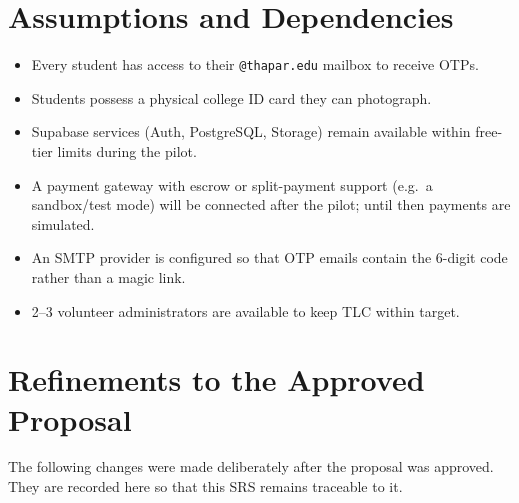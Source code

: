 \documentclass[11pt,a4paper]{scrreprt}
\begin{document}
\section{Assumptions and Dependencies}
\begin{itemize}
  \item Every student has access to their \texttt{@thapar.edu} mailbox to
    receive OTPs.
  \item Students possess a physical college ID card they can photograph.
  \item Supabase services (Auth, PostgreSQL, Storage) remain available
    within free-tier limits during the pilot.
  \item A payment gateway with escrow or split-payment support (e.g.\ a
    sandbox/test mode) will be connected after the pilot; until then
    payments are simulated.
  \item An SMTP provider is configured so that OTP emails contain the
    6-digit code rather than a magic link.
  \item 2--3 volunteer administrators are available to keep TLC within target.
\end{itemize}

\section{Refinements to the Approved Proposal}\label{sec:deviations}
The following changes were made deliberately after the proposal was
approved. They are recorded here so that this SRS remains traceable to it.
\end{document}
